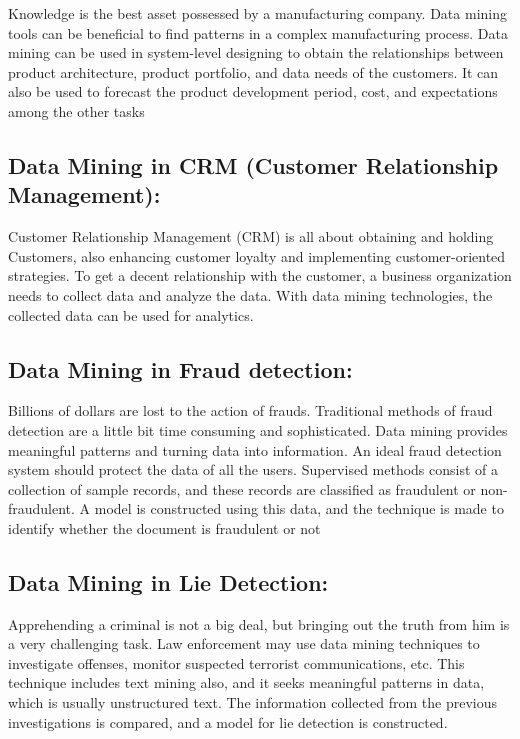 \documentclass[a4paper,10pt]{article}
\begin{document}
Knowledge is the best asset possessed by a manufacturing company. Data mining tools can be beneficial to find patterns in a complex manufacturing process. Data mining can be used in system-level designing to obtain the relationships between product architecture, product portfolio, and data needs of the customers. It can also be used to forecast the product development period, cost, and expectations among the other tasks
\newpage
\subsection{Data Mining in CRM (Customer Relationship Management):}

Customer Relationship Management (CRM) is all about obtaining and holding Customers, also enhancing customer loyalty and implementing customer-oriented strategies. To get a decent relationship with the customer, a business organization needs to collect data and analyze the data. With data mining technologies, the collected data can be used for analytics.

\subsection{Data Mining in Fraud detection:}

Billions of dollars are lost to the action of frauds. Traditional methods of fraud detection are a little bit time consuming and sophisticated. Data mining provides meaningful patterns and turning data into information. An ideal fraud detection system should protect the data of all the users. Supervised methods consist of a collection of sample records, and these records are classified as fraudulent or non-fraudulent. A model is constructed using this data, and the technique is made to identify whether the document is fraudulent or not

\subsection{Data Mining in Lie Detection:}


Apprehending a criminal is not a big deal, but bringing out the truth from him is a very challenging task. Law enforcement may use data mining techniques to investigate offenses, monitor suspected terrorist communications, etc. This technique includes text mining also, and it seeks meaningful patterns in data, which is usually unstructured text. The information collected from the previous investigations is compared, and a model for lie detection is constructed.
\end{document}
